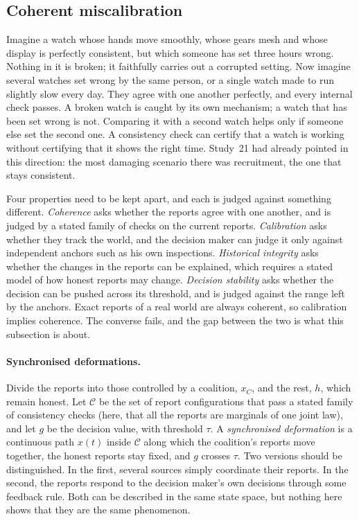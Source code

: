 \documentclass[11pt]{article}
\theoremstyle{definition}\newtheorem{definition}[theorem]{Definition}\newtheorem{remark}[theorem]{Remark}\newtheorem{example}[theorem]{Example}\newtheorem{problem}[theorem]{Open problem}\crefname{problem}{Problem}{Problems}
\begin{document}
\subsection{Coherent miscalibration}\label{sec:miscal}
Imagine a watch whose hands move smoothly, whose gears mesh and whose display is perfectly consistent, but which someone has set three hours wrong. Nothing in it is broken; it faithfully carries out a corrupted setting. Now imagine several watches set wrong by the same person, or a single watch made to run slightly slow every day. They agree with one another perfectly, and every internal check passes. A broken watch is caught by its own mechanism; a watch that has been set wrong is not. Comparing it with a second watch helps only if someone else set the second one. A consistency check can certify that a watch is working without certifying that it shows the right time. Study~21 had already pointed in this direction: the most damaging scenario there was recruitment, the one that stays consistent.

Four properties need to be kept apart, and each is judged against something different. \emph{Coherence} asks whether the reports agree with one another, and is judged by a stated family of checks on the current reports. \emph{Calibration} asks whether they track the world, and the decision maker can judge it only against independent anchors such as his own inspections. \emph{Historical integrity} asks whether the changes in the reports can be explained, which requires a stated model of how honest reports may change. \emph{Decision stability} asks whether the decision can be pushed across its threshold, and is judged against the range left by the anchors. Exact reports of a real world are always coherent, so calibration implies coherence. The converse fails, and the gap between the two is what this subsection is about.

\paragraph{Synchronised deformations.} Divide the reports into those controlled by a coalition, $x_C$, and the rest, $h$, which remain honest. Let $\mathcal C$ be the set of report configurations that pass a stated family of consistency checks (here, that all the reports are marginals of one joint law), and let $g$ be the decision value, with threshold $\tau$. A \emph{synchronised deformation} is a continuous path $x(t)$ inside $\mathcal C$ along which the coalition's reports move together, the honest reports stay fixed, and $g$ crosses $\tau$. Two versions should be distinguished. In the first, several sources simply coordinate their reports. In the second, the reports respond to the decision maker's own decisions through some feedback rule. Both can be described in the same state space, but nothing here shows that they are the same phenomenon.
\end{document}
